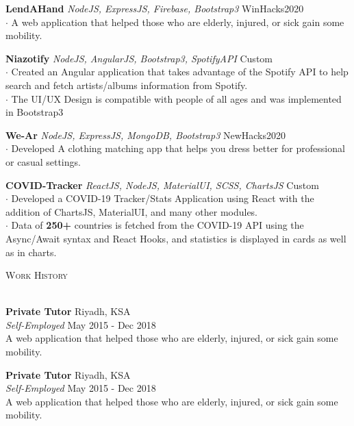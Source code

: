 \documentclass[a4paper]{article}
\newcommand{\lineunder} {
    \vspace*{-8pt} \\
    \hspace*{-18pt} \hrulefill \\
}
\newcommand{\header} [1] {
    {\hspace*{-18pt}\vspace*{6pt} \textsc{#1}}
    \vspace*{-6pt} \lineunder
}
\begin{document}
{\textbf{LendAHand}} {\sl NodeJS, ExpressJS, Firebase, Bootstrap3} \hfill WinHacks2020\\
$\cdot$ A web application that helped those who are elderly, injured, or sick gain some mobility.\\
\vspace*{2mm}

{\textbf{Niazotify}} {\sl NodeJS, AngularJS, Bootstrap3, SpotifyAPI} \hfill Custom\\
$\cdot$ Created an Angular application that takes advantage of the Spotify API to help search and fetch artists/albums information from Spotify.\\  $\cdot$ The UI/UX Design is compatible with people of all ages and was implemented in Bootstrap3 \\
\vspace*{2mm}

{\textbf{We-Ar}} {\sl NodeJS, ExpressJS, MongoDB, Bootstrap3} \hfill NewHacks2020\\
$\cdot$ Developed A clothing matching app that helps you dress better for professional or casual settings.\\
\vspace*{2mm}

{\textbf{COVID-Tracker}} {\sl ReactJS, NodeJS, MaterialUI, SCSS, ChartsJS} \hfill Custom\\
$\cdot$ Developed a COVID-19 Tracker/Stats Application using React with the addition of ChartsJS, MaterialUI, and many other modules.\\ $\cdot$ Data of {\textbf{250+}} countries is fetched from the COVID-19 API using the Async/Await syntax and React Hooks,   and statistics is displayed in cards as well as in charts.\\
\vspace*{2mm}

\header{Work History}
\vspace{0.6mm}

\textbf{Private Tutor} \hfill Riyadh, KSA\\
\textit{Self-Employed} \hfill May 2015 - Dec 2018\\\vspace*{0.5mm}
A web application that helped those who are elderly, injured, or sick gain some mobility.\\
\vspace*{2mm}

\textbf{Private Tutor} \hfill Riyadh, KSA\\
\textit{Self-Employed} \hfill May 2015 - Dec 2018\\\vspace*{0.5mm}
A web application that helped those who are elderly, injured, or sick gain some mobility.\\
\vspace*{2mm}

\ 
\end{document}
